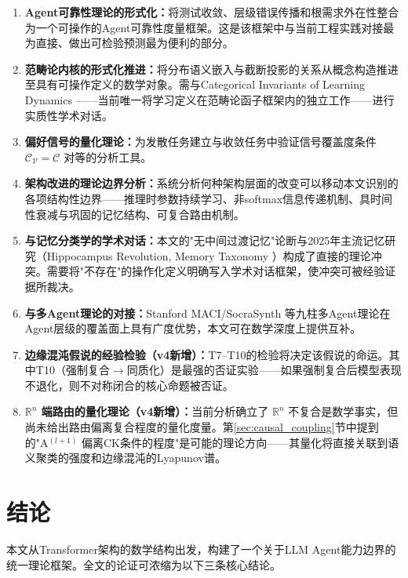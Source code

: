 \documentclass[11pt,a4paper]{article}
\theoremstyle{definition}
\newcommand{\verifspace}{\mathcal{C}_{\mathcal{V}}}
\newcommand{\taskcspace}{\mathcal{C}}
\begin{document}
\begin{enumerate}[leftmargin=*,itemsep=0.3em]
    \item \textbf{Agent可靠性理论的形式化：}将测试收敛、层级错误传播和根需求外在性整合为一个可操作的Agent可靠性度量框架。这是该框架中与当前工程实践对接最为直接、做出可检验预测最为便利的部分。
    \item \textbf{范畴论内核的形式化推进：}将分布语义嵌入与截断投影的关系从概念构造推进至具有可操作定义的数学对象。需与Categorical Invariants of Learning Dynamics \cite{categorical_invariants_2025}——当前唯一将学习定义在范畴论函子框架内的独立工作——进行实质性学术对话。
    \item \textbf{偏好信号的量化理论：}为发散任务建立与收敛任务中验证信号覆盖度条件 $\verifspace = \taskcspace$ 对等的分析工具。
    \item \textbf{架构改进的理论边界分析：}系统分析何种架构层面的改变可以移动本文识别的各项结构性边界——推理时参数持续学习、非softmax信息传递机制、具时间性衰减与巩固的记忆结构、可复合路由机制。
    \item \textbf{与记忆分类学的学术对话：}本文的"无中间过渡记忆"论断与2025年主流记忆研究（Hippocampus Revolution, Memory Taxonomy \cite{memory_taxonomy_2025}）构成了直接的理论冲突。需要将"不存在"的操作化定义明确写入学术对话框架，使冲突可被经验证据所裁决。
    \item \textbf{与多Agent理论的对接：}Stanford MACI/SocraSynth \cite{stanford_maci} 等九柱多Agent理论在Agent层级的覆盖面上具有广度优势，本文可在数学深度上提供互补。
    \item \textbf{边缘混沌假说的经验检验（v4新增）：}T7--T10的检验将决定该假说的命运。其中T10（强制复合$\to$同质化）是最强的否证实验——如果强制复合后模型表现不退化，则不对称闭合的核心命题被否证。
    \item \textbf{$\mathbb{R}^n$ 端路由的量化理论（v4新增）：}当前分析确立了 $\mathbb{R}^n$ 不复合是数学事实，但尚未给出路由偏离复合程度的量化度量。第\ref{sec:causal_coupling}节中提到的"A$^{(l+1)}$ 偏离CK条件的程度"是可能的理论方向——其量化将直接关联到语义聚类的强度和边缘混沌的Lyapunov谱。
\end{enumerate}


\section{结论}

本文从Transformer架构的数学结构出发，构建了一个关于LLM Agent能力边界的统一理论框架。全文的论证可浓缩为以下三条核心结论。
\end{document}
